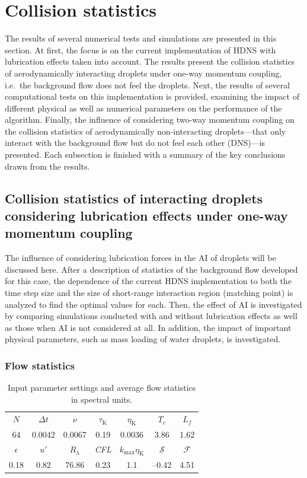 \documentclass[../thesis.tex]{subfiles}
\begin{document}
\section{Collision statistics\label{sec:col}}
The results of several numerical tests and simulations are presented in this section. At first, the focus is on the current implementation of HDNS with lubrication effects taken into account. The results present the collision statistics of aerodynamically interacting droplets under one-way momentum coupling, i.e.\ the background flow does not feel the droplets. Next, the results of several computational tests on this implementation is provided, examining the impact of different physical as well as numerical parameters on the performance of the algorithm. Finally, the influence of considering two-way momentum coupling on the collision statistics of aerodynamically non-interacting droplets---that only interact with the background flow but do not feel each other (DNS)---is presented. Each subsection is finished with a summary of the key conclusions drawn from the results.



\subsection{Collision statistics of interacting droplets considering lubrication effects under one-way momentum coupling\label{sec:lub}}
The influence of considering lubrication forces in the AI of droplets will be discussed here. After a description of statistics of the background flow developed for this case, the dependence of the current HDNS implementation to both the time step size and the size of short-range interaction region (matching point) is analyzed to find the optimal values for each. Then, the effect of AI is investigated by comparing simulations conducted with and without lubrication effects as well as those when AI is not considered at all. In addition, the impact of important physical parameters, such as mass loading of water droplets, is investigated.



\subsubsection{Flow statistics}

\begin{table}[!b]%
\center
  \begin{tabular}{ccccccc}
  \hline
  $N$ & $\Delta t$ & $\nu$ & $\tau_\text{K}$ & $\eta_\text{K}$ & $T_e$ & $L_f$\\
  64 & 0.0042 & 0.0067 & 0.19 & 0.0036 & 3.86 & 1.62\\\hline
  $\epsilon$ & $u'$ & $R_{\lambda}$ & \textit{CFL} & $k_\text{max}\eta_\text{K}$ & $\mathcal{S}$ & $\mathcal{F}$\\
  0.18 & 0.82 & 76.86 & 0.23 & 1.1 & --0.42 & 4.51\\
  \hline
  \end{tabular}
  \caption{Input parameter settings and average flow statistics in spectral units.}
  \label{tab:1}
\end{table}%
\end{document}
